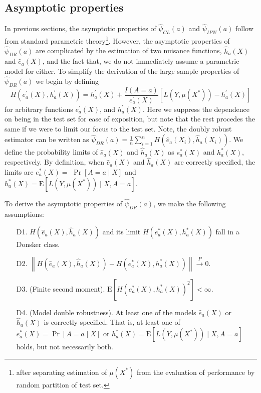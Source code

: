 \subsection{Asymptotic properties}
In previous sections, the asymptotic properties of $\widehat{\psi}_{CL}(a)$ and $\widehat{\psi}_{IPW}(a)$ follow from standard parametric theory\footnote{after separating estimation of $\mu(X^*)$ from the evaluation of performance by random partition of test set.}. However, the asymptotic properties of $\widehat{\psi}_{DR}(a)$ are complicated by the estimation of two nuisance functions, $\widehat{h}_a(X)$ and $\widehat{e}_a(X)$, and the fact that, we do not immediately assume a parametric model for either. To simplify the derivation of the large sample properties of $\widehat{\psi}_{DR}(a)$ we begin by defining
$$
H\left(e_a^{\prime}(X), h_a^{\prime}(X)\right)=h_a^{\prime}(X)+\frac{I(A = a)}{e_a^{\prime}(X)}\left[L\left(Y, \mu\left(X^*\right)\right)-h_a^{\prime}(X)\right]
$$
for arbitrary functions $e_a^{\prime}(X)$, and $h_a^{\prime}(X)$. Here we suppress the dependence on being in the test set for ease of exposition, but note that the rest procedes the same if we were to limit our focus to the test set. Note, the doubly robust estimator can be written as $\widehat{\psi}_{DR}(a)=\frac{1}{n} \sum_{i=1}^n H\left(\widehat{e}_a\left(X_i\right), \widehat{h}_a\left(X_i\right)\right)$. We define the probability limits of $\widehat{e}_a(X)$ and $\widehat{h}_a(X)$ as $e_a^*(X)$ and $h_a^*(X)$, respectively. By definition, when $\widehat{e}_a(X)$ and $\widehat{h}_a(X)$ are correctly specified, the limits are  $e_a^*(X)=$ $\operatorname{Pr}[A=a \mid X]$ and $h^*_a(X)=\mathrm{E}\left[L\left(Y, \mu\left(X^*\right)\right) \mid X, A=a\right]$.

To derive the asymptotic properties of $\widehat{\psi}_{DR}(a)$, we make the following assumptions:

\begin{enumerate}
    \item[D1.] $H(\widehat{e}_a(X), \widehat{h}_a(X))$ and its limit $H\left(e^*_a(X), h^*_a(X)\right)$ fall in a Donsker class.
    \item[D2.]  $\left\|H(\widehat{e}_a(X), \widehat{h}_a(X))-H\left(e^*_a(X), h^*_a(X)\right)\right\| \stackrel{P}{\longrightarrow} 0$.
    \item[D3.] (Finite second moment). $\mathrm{E}\left[H\left(e^*_a(X), h^*_a(X)\right)^2\right]<\infty$.
    \item[D4.] (Model double robustness). At least one of the models $\widehat{e}_a(X)$ or $\widehat{h}_a(X)$ is correctly specified. That is, at least one of $e^*_a(X)=\operatorname{Pr}[A=a \mid X]$ or $h^*_a(X)=\mathrm{E}\left[L\left(Y, \mu\left(X^*\right)\right) \mid X, A=a\right]$ holds, but not necessarily both.
\end{enumerate}

